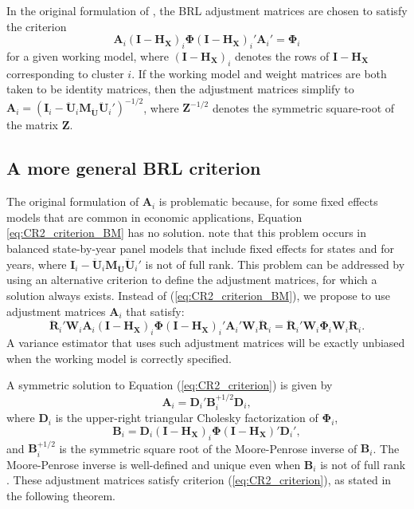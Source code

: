 \documentclass[12pt]{article}\usepackage[]{graphicx}\usepackage[]{color}
\newcommand{\bm}{\mathbf}
\newcommand{\bs}{\boldsymbol}
\begin{document}
In the original formulation of \citet{Bell2002bias}, the BRL adjustment matrices are chosen to satisfy the criterion
\begin{equation}
\label{eq:CR2_criterion_BM}
\bm{A}_i \left(\bm{I} - \bm{H_X}\right)_i \bs\Phi \left(\bm{I} - \bm{H_X}\right)_i' \bm{A}_i'  =  \bs\Phi_i 
\end{equation}
for a given working model, where $\left(\bm{I} - \bm{H_X}\right)_i$ denotes the rows of $\bm{I} - \bm{H_X}$ corresponding to cluster $i$.
If the working model and weight matrices are both taken to be identity matrices, then the adjustment matrices simplify to $\bm{A}_i =  \left(\bm{I}_i - \bm{\ddot{U}}_i \bm{M_{\ddot{U}}} \bm{\ddot{U}}_i'\right)^{-1/2}$, where $\bm{Z}^{-1/2}$ denotes the symmetric square-root of the matrix $\bm{Z}$. 

\subsection{A more general BRL criterion}

The original formulation of $\bm{A}_i$ is problematic because, for some fixed effects models that are common in economic applications, Equation \ref{eq:CR2_criterion_BM} has no solution. 
\citet{Angrist2009mostly} note that this problem occurs in balanced state-by-year panel models that include fixed effects for states and for years, where $\bm{I}_i - \bm{\ddot{U}}_i \bm{M_{\ddot{U}}} \bm{\ddot{U}}_i'$ is not of full rank. 
This problem can be addressed by using an alternative criterion to define the adjustment matrices, for which a solution always exists. 
Instead of (\ref{eq:CR2_criterion_BM}), we propose to use adjustment matrices $\bm{A}_i$ that satisfy:
\begin{equation}
\label{eq:CR2_criterion}
\bm{\ddot{R}}_i' \bm{W}_i \bm{A}_i \left(\bm{I} - \bm{H_X}\right)_i \bs\Phi \left(\bm{I} - \bm{H_X}\right)_i' \bm{A}_i' \bm{W}_i \bm{\ddot{R}}_i = \bm{\ddot{R}}_i' \bm{W}_i \bs\Phi_i \bm{W}_i \bm{\ddot{R}}_i.
\end{equation}
A variance estimator that uses such adjustment matrices will be exactly unbiased when the working model is correctly specified.

A symmetric solution to Equation (\ref{eq:CR2_criterion}) is given by
\begin{equation}
\label{eq:CR2_adjustment}
\bm{A}_i = \bm{D}_i' \bm{B}_i^{+1/2} \bm{D}_i,
\end{equation}
where $\bm{D}_i$ is the upper-right triangular Cholesky factorization of $\bs\Phi_i$, 
\begin{equation}
\label{eq:CR2_Bmatrix}
\bm{B}_i = \bm{D}_i\left(\bm{I} - \bm{H_X}\right)_i \bs\Phi \left(\bm{I} - \bm{H_X}\right)' \bm{D}_i',
\end{equation}
and $\bm{B}_i^{+1/2}$ is the symmetric square root of the Moore-Penrose inverse of $\bm{B}_i$. 
The Moore-Penrose inverse is well-defined and unique even when $\bm{B}_i$ is not of full rank \citep[][Thm. 9.18]{Banerjee2014linear}. These adjustment matrices satisfy criterion (\ref{eq:CR2_criterion}), as stated in the following theorem.
\end{document}
